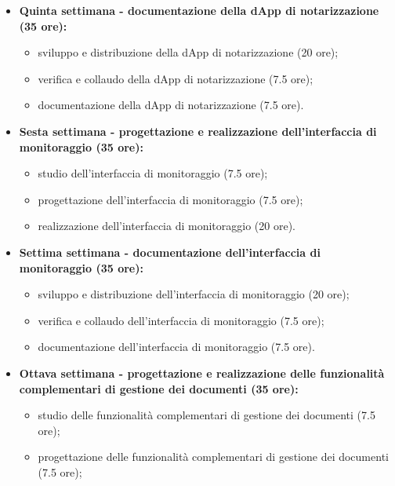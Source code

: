 {\begin{itemize}
\begin{itemize}
            \item progettazione della dApp di notarizzazione (7.5 ore);
            \item realizzazione della dApp di notarizzazione (20 ore).
        \end{itemize}
        \item \textbf{Quinta settimana - documentazione della dApp di notarizzazione (35 ore):} 
        \begin{itemize}
            \item sviluppo e distribuzione della dApp di notarizzazione (20 ore);
            \item verifica e collaudo della dApp di notarizzazione (7.5 ore);
            \item documentazione della dApp di notarizzazione (7.5 ore).
        \end{itemize}
        \item \textbf{Sesta settimana - progettazione e realizzazione dell'interfaccia di monitoraggio (35 ore):} 
        \begin{itemize}
            \item studio dell'interfaccia di monitoraggio (7.5 ore);
            \item progettazione dell'interfaccia di monitoraggio (7.5 ore);
            \item realizzazione dell'interfaccia di monitoraggio (20 ore).
        \end{itemize}
        \newpage
        \item \textbf{Settima settimana - documentazione dell'interfaccia di monitoraggio (35 ore):} 
        \begin{itemize}
            \item sviluppo e distribuzione dell'interfaccia di monitoraggio (20 ore);
            \item verifica e collaudo dell'interfaccia di monitoraggio (7.5 ore);
            \item documentazione dell'interfaccia di monitoraggio (7.5 ore).
        \end{itemize}
        \item \textbf{Ottava settimana - progettazione e realizzazione delle funzionalità complementari di gestione dei documenti (35 ore):} 
        \begin{itemize}
            \item studio delle funzionalità complementari di gestione dei documenti (7.5 ore);
            \item progettazione delle funzionalità complementari di gestione dei documenti (7.5 ore);

\end{itemize}
\end{itemize}}
